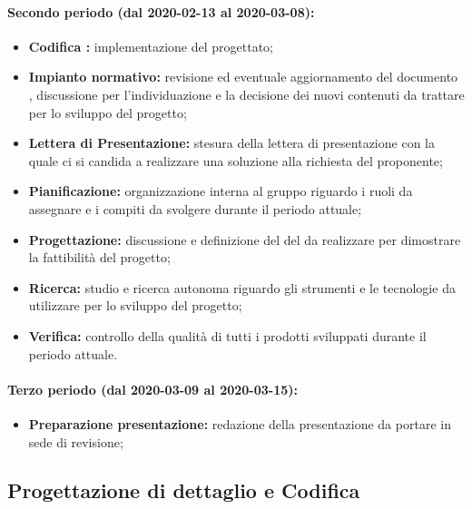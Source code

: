 				\paragraph{Secondo periodo (dal 2020-02-13 al 2020-03-08):}
				
					\begin{itemize}
						\item \textbf{Codifica :} implementazione del  progettato;
						\item \textbf{Impianto normativo:} revisione ed eventuale aggiornamento del documento , discussione per l'individuazione e la decisione dei nuovi contenuti da trattare per lo sviluppo del progetto;
						\item \textbf{Lettera di Presentazione:} stesura della lettera di presentazione con la quale ci si candida a realizzare una soluzione alla richiesta del proponente;
						\item \textbf{Pianificazione:} organizzazione interna al gruppo riguardo i ruoli da assegnare e i compiti da svolgere durante il periodo attuale;
						\item \textbf{Progettazione:} discussione e definizione del  del  da realizzare per dimostrare la fattibilità del progetto;
						\item \textbf{Ricerca:} studio e ricerca autonoma riguardo gli strumenti e le tecnologie da utilizzare per lo sviluppo del progetto;
						\item \textbf{Verifica:} controllo della qualità di tutti i prodotti sviluppati durante il periodo attuale.
					\end{itemize}
		
				\paragraph{Terzo periodo (dal 2020-03-09 al 2020-03-15):}
				
					\begin{itemize}
						\item \textbf{Preparazione presentazione:} redazione della presentazione da portare in sede di revisione;
					\end{itemize}

		\subsection{Progettazione di dettaglio e Codifica}
		
